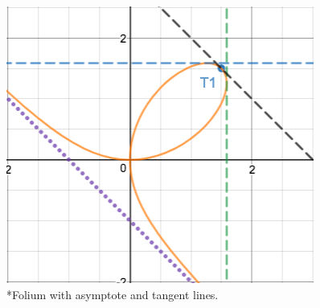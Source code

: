 \documentclass[a4paper,openright, 14pt]{article}
\begin{document}
\includegraphics[width = 10 cm, height = 10 cm]{FG.png}
\\*Folium with asymptote and tangent lines.
\end{document}
